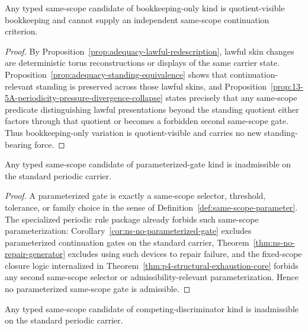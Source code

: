 \begin{manualproposition}
\label{prop:13-5H-bookkeeping-no-standing-force}
Any typed same-scope candidate of bookkeeping-only kind is quotient-visible bookkeeping and cannot
supply an independent same-scope continuation criterion.
\end{manualproposition}

\begin{proof}
By Proposition~\ref{prop:adequacy-lawful-redescription}, lawful skin changes are deterministic torus
reconstructions or displays of the same carrier state. Proposition~\ref{prop:adequacy-standing-equivalence}
shows that continuation-relevant standing is preserved across those lawful skins, and
Proposition~\ref{prop:13-5A-periodicity-pressure-divergence-collapse} states precisely that any
same-scope predicate distinguishing lawful presentations beyond the standing quotient either factors
through that quotient or becomes a forbidden second same-scope gate. Thus bookkeeping-only variation
is quotient-visible and carries no new standing-bearing force.
\end{proof}

\begin{manualproposition}
\label{prop:13-5I-parameterized-gates-forbidden}
Any typed same-scope candidate of parameterized-gate kind is inadmissible on the standard periodic
carrier.
\end{manualproposition}

\begin{proof}
A parameterized gate is exactly a same-scope selector, threshold, tolerance, or family choice in the
sense of Definition~\ref{def:same-scope-parameter}. The specialized periodic rule package already
forbids such same-scope parameterization: Corollary~\ref{cor:ns-no-parameterized-gate} excludes
parameterized continuation gates on the standard carrier, Theorem~\ref{thm:ns-no-repair-generator}
excludes using such devices to repair failure, and the fixed-scope closure logic internalized in
Theorem~\ref{thm:p4-structural-exhaustion-core} forbids any second same-scope selector or
admissibility-relevant parameterization. Hence no parameterized same-scope gate is admissible.
\end{proof}

\begin{manualproposition}
\label{prop:13-5J-competing-discriminator-forbidden}
Any typed same-scope candidate of competing-discriminator kind is inadmissible on the standard
periodic carrier.
\end{manualproposition}

